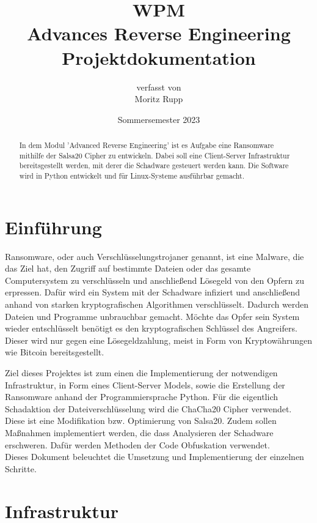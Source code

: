 \documentclass[12pt]{article}
\title{\small{WPM}\\\vspace{3mm}\Large{Advances Reverse Engineering\\\small{Projektdokumentation}}}
\author{ \small{verfasst von}\\ Moritz Rupp}
\date{Sommersemester 2023}
\begin{document}
\maketitle
\newpage
\tableofcontents
\newpage

\begin{abstract}
\noindent In dem Modul 'Advanced Reverse Engineering' ist es Aufgabe eine Ransomware mithilfe der Salsa20 Cipher zu entwickeln. Dabei soll eine Client-Server Infrastruktur bereitsgestellt werden, mit derer die Schadware gesteuert werden kann. Die Software wird in Python entwickelt und für Linux-Systeme ausführbar gemacht.
\end{abstract}
\section{Einführung}
Ransomware, oder auch Verschlüsselungstrojaner genannt, ist eine Malware, die das Ziel hat, den Zugriff auf bestimmte Dateien oder das gesamte Computersystem  zu verschlüsseln und anschließend Lösegeld von den Opfern zu erpressen. Dafür wird ein System mit der Schadware infiziert und anschließend anhand von starken kryptografischen Algorithmen verschlüsselt. Dadurch werden Dateien und Programme unbrauchbar gemacht. Möchte das Opfer sein System wieder entschlüsselt benötigt es den kryptografischen Schlüssel des Angreifers. Dieser wird nur gegen eine Lösegeldzahlung, meist in Form von Kryptowährungen wie Bitcoin bereitsgestellt. 
\newline


Ziel dieses Projektes ist zum einen die Implementierung der notwendigen Infrastruktur, in Form eines Client-Server Models, sowie die Erstellung der Ransomware anhand der Programmiersprache Python.
Für die eigentlich Schadaktion der Dateiverschlüsselung wird die ChaCha20 Cipher verwendet. Diese ist eine Modifikation bzw. Optimierung von Salsa20.
Zudem sollen Maßnahmen implementiert werden, die dass Analysieren der Schadware erschweren. Dafür werden Methoden der Code Obfuskation verwendet.\\
Dieses Dokument beleuchtet die Umsetzung und Implementierung der einzelnen Schritte.

\newpage
\section{Infrastruktur}
\end{document}
